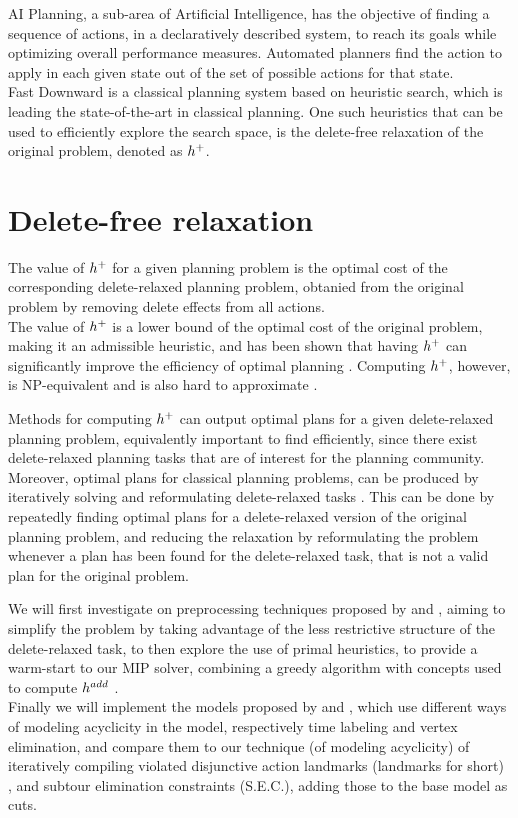 AI Planning, a sub-area of Artificial Intelligence, has the objective of finding a sequence of actions, in a declaratively described system, to reach its goals while optimizing overall performance measures. Automated planners find the action to apply in each given state out of the set of possible actions for that state.\\
Fast Downward \cite{Helmert_06} is a classical planning system based on heuristic search, which is leading the state-of-the-art in classical planning. One such heuristics that can be used to efficiently explore the search space, is the delete-free relaxation of the original problem, denoted as $h^+$.

\section{Delete-free relaxation}
The value of $h^+$ for a given planning problem is the optimal cost of the corresponding delete-relaxed planning problem, obtanied from the original problem by removing delete effects from all actions.\\
The value of $h^+$ is a lower bound of the optimal cost of the original problem, making it an admissible heuristic, and has been shown that having $h^+$ can significantly improve the efficiency of optimal planning \cite{Helmert_09}. Computing $h^+$, however, is NP-equivalent \cite{Bylander_94} and is also hard to approximate \cite{Helmert_09}.

Methods for computing $h^+$ can output optimal plans for a given delete-relaxed planning problem, equivalently important to find efficiently, since there exist delete-relaxed planning tasks that are of interest for the planning community. Moreover, optimal plans for classical planning problems, can be produced by iteratively solving and reformulating delete-relaxed tasks \cite{LB_Haslum_12}. This can be done by repeatedly finding optimal plans for a delete-relaxed version of the original planning problem, and reducing the relaxation by reformulating the problem whenever a plan has been found for the delete-relaxed task, that is not a valid plan for the original problem.

We will first investigate on preprocessing techniques proposed by \cite{Imai_15} and \cite{MLM_Haslum_12}, aiming to simplify the problem by taking advantage of the less restrictive structure of the delete-relaxed task, to then explore the use of primal heuristics, to provide a warm-start to our MIP solver, combining a greedy algorithm with concepts used to compute $h^{add}$ \cite{Bonet_01}.\\
Finally we will implement the models proposed by \cite{Imai_15} and \cite{Rankooh_22}, which use different ways of modeling acyclicity in the model, respectively time labeling and vertex elimination, and compare them to our technique (of modeling acyclicity) of iteratively compiling violated disjunctive action landmarks (landmarks for short) \cite{MLM_Haslum_12}, \cite{Bonet_11} and subtour elimination constraints (S.E.C.), adding those to the base model as cuts.

